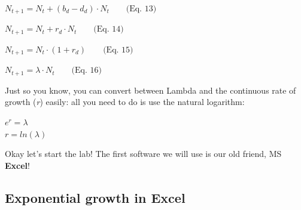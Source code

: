\documentclass[
]{article}
\begin{document}
\(N_{t+1}=N_t + (b_d - d_d) \cdot N_t \qquad \text{(Eq. 13)}\)

\(N_{t+1}=N_t + r_d \cdot N_t \qquad \text{(Eq. 14)}\)

\(N_{t+1}=N_t \cdot (1 + r_d) \qquad \text{(Eq. 15)}\)

\(N_{t+1}=\lambda \cdot N_t \qquad \text{(Eq. 16)}\)

Just so you know, you can convert between Lambda and the continuous rate
of growth (\emph{r}) easily: all you need to do is use the natural
logarithm:

\(e^r = \lambda\)\\
\(r = ln(\lambda)\)

Okay let's start the lab! The first software we will use is our old
friend, MS \textbf{Excel}!

\hypertarget{exponential-growth-in-excel}{%
\subsection{Exponential growth in
Excel}\label{exponential-growth-in-excel}}
\end{document}

